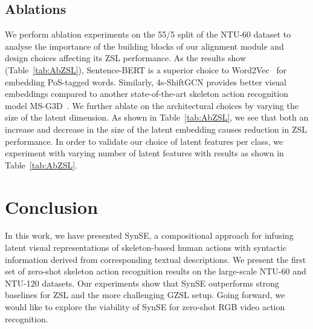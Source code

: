 \documentclass{article}
\begin{document}
\subsection{Ablations}

We perform ablation experiments on the 55/5 split of the NTU-60 dataset to analyse the importance of the building blocks of our alignment module and design choices affecting its ZSL performance. As the results show (Table~\ref{tab:AbZSL}), Sentence-BERT is a superior choice to Word2Vec~\cite{mikolov2013efficient} for embedding PoS-tagged words. Similarly, 4s-ShiftGCN provides better visual embeddings compared to another state-of-the-art skeleton action recognition model MS-G3D~\cite{liu2020disentangling}. We further ablate on the architectural choices by varying the size of the latent dimension. As shown in Table~\ref{tab:AbZSL}, we see that both an increase and decrease in the size of the latent embedding causes reduction in ZSL performance. In order to validate our choice of  latent features per class, we experiment with varying number of latent features with results as shown in Table~\ref{tab:AbZSL}.

\section{Conclusion}
\label{sec:conclusion}

In this work, we have presented SynSE, a compositional approach for infusing latent visual representations of skeleton-based human actions with syntactic information derived from corresponding textual descriptions. We present the first set of zero-shot skeleton action recognition results on the large-scale NTU-60 and NTU-120 datasets. Our experiments show that SynSE outperforms strong baselines for ZSL and the more challenging GZSL setup. Going forward, we would like to explore the viability of SynSE for zero-shot RGB video action recognition.



\end{document}
